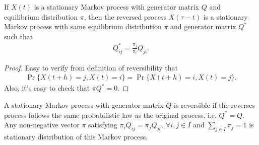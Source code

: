 \documentclass[a4paper,10pt,english]{article}
\begin{document}
\begin{lem} If $X(t)$ is a stationary Markov process with generator matrix $Q$ and equilibrium distribution $\pi$, then the reversed process $X(\tau -t)$ is a stationary Markov process with same equilibrium distribution $\pi$ and generator matrix $Q^{\ast}$ such that
\begin{align*}
Q^{\ast}_{ij} = \frac{\pi_j}{\pi_i}Q_{ji}.
\end{align*}
\end{lem}
\begin{proof} Easy to verify from definition of reversibility that 
\begin{align*}
\Pr\{X(t+h) = j, X(t) = i\} = \Pr\{X(t+h) = i, X(t) = j\}.
\end{align*}
Also, it's easy to check that $\pi Q^{\ast} = 0$.
\end{proof}

\begin{lem} A stationary Markov process with generator matrix $Q$ is reversible if the reverses process follows the same probabilistic law as the original process, i.e. $Q^*= Q$. Any non-negative vector $\pi$ satisfying $\pi_iQ_{ij}=\pi_jQ_{ji},~\forall i,j \in I$ and $\sum_{j \in I}\pi_j=1$ is stationary distribution of this Markov process. 
\end{lem}


\end{document}
